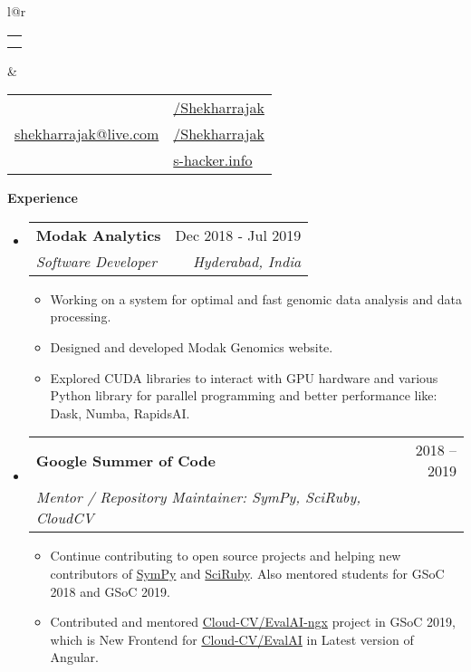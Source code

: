 \documentclass[letterpaper,12pt]{article}[leftmargin=*]
\makeatletter
\def \fullname {Shekhar Prasad Rajak}
\def \subtitle {}
\def \linkedinicon {\faLinkedin}
\def \linkedinlink {https://www.linkedin.com/in/shekhar-prasad-rajak-9988b626/}
\def \linkedintext {/Shekharrajak}
\def \phoneicon {\faPhone}
\def \phonetext {+91-8142478937}
\def \emailicon {\faEnvelope}
\def \emaillink {mailto:shekharrajak@live.com}
\def \emailtext {shekharrajak@live.com}
\def \githubicon {\faGithub}
\def \githublink {https://github.com/Shekharrajak}
\def \githubtext {/Shekharrajak}
\def \websiteicon {\faGlobe}
\def \websitelink {http://s-hacker.info/}
\def \websitetext {s-hacker.info}
\def \headertype {\doublecol} %
\def \entryspacing {-0pt}
\def \linkedin {\linkedinicon \hspace{3pt}\href{\linkedinlink}{\linkedintext}}
\def \phone {\phoneicon \hspace{3pt}{ \phonetext}}
\def \email {\emailicon \hspace{3pt}\href{\emaillink}{\emailtext}}
\def \github {\githubicon \hspace{3pt}\href{\githublink}{\githubtext}}
\def \website {\websiteicon \hspace{3pt}\href{\websitelink}{\websitetext}}
\renewcommand{\section}[2]{\vspace{5pt}
  \colorbox{secondary}{\color{white}\raggedbottom\normalsize\textbf{{#1}{\hspace{7pt}#2}}}
}
\newcommand{\resumeEntryStart}{\begin{itemize}[leftmargin=2.5mm]}
\newcommand{\resumeEntryEnd}{\end{itemize}\vspace{\entryspacing}}
\newcommand{\resumeItemListStart}{\begin{itemize}[leftmargin=4.5mm]}
\newcommand{\resumeItemListEnd}{\end{itemize}}
\newcommand{\resumeItem}[1]{
  \item\small{
    {#1 \vspace{-2pt}}
  }
}
\newcommand{\resumeEntryTSDL}[4]{
  \vspace{-1pt}\item[]
    \begin{tabular*}{0.97\textwidth}{l@{\extracolsep{\fill}}r}
      \textbf{\color{primary}#1} & {\firabook\color{accent}\small#2} \\
      \textit{\color{accent}\small#3} & \textit{\color{accent}\small#4} \\
    \end{tabular*}\vspace{-6pt}
}
\newcommand{\doublecol}[6]{
  \begin{tabular*}{\textwidth}{l@{\extracolsep{\fill}}r}
    {
      \begin{tabular}[c]{l}
        \fontsize{25}{25}\selectfont{\color{primary}{{\textbf{\fullname}}}} \\
        {\textit{\subtitle}} %
      \end{tabular}
    } & {
      \begin{tabular}[c]{l@{\hspace{1.5em}}l}
        {\small#4} & {\small#1} \\
        {\small#5} & {\small#2} \\
        {\small#6} & {\small#3}
      \end{tabular}
    }
  \end{tabular*}
}
\newcommand{\singlecol}[6]{
  \begin{tabular*}{\textwidth}{l@{\extracolsep{\fill}}r}
    {
      \begin{tabular}[b]{l}
        \fontsize{35}{45}\selectfont{\color{primary}{{\textbf{\fullname}}}} \\
        {\textit{\subtitle}} %
      \end{tabular}
    } & {
      \begin{tabular}[c]{l}
        {\small#1} \\
        {\small#2} \\
        {\small#3} \\
        {\small#4} \\
        {\small#5} \\
        {\small#6}
      \end{tabular}
    }
  \end{tabular*}
}
\makeatother
\begin{document}


\headertype{\linkedin}{\github}{\website}{\phone}{\email}{} %
\vspace{-10pt} %



\section{\faPieChart}{Experience}

  \resumeEntryStart
    \resumeEntryTSDL
      {Modak Analytics}{Dec 2018 - Jul 2019}
      {Software Developer}{Hyderabad, India}
    \resumeItemListStart
      \resumeItem {Working on a system for optimal and fast genomic data analysis and
data processing.}
      \resumeItem {Designed and developed Modak Genomics website.}
      \resumeItem {Explored CUDA libraries to interact with GPU hardware and various Python library for parallel programming and better performance like: Dask, Numba, RapidsAI.}
    \resumeItemListEnd
  \resumeEntryEnd

   \resumeEntryStart
    \resumeEntryTSDL
      {Google Summer of Code}{2018 -- 2019}
      {Mentor / Repository Maintainer: SymPy, SciRuby, CloudCV}{}
    \resumeItemListStart
      \resumeItem {Continue contributing to open source projects and helping new contributors of \href{https://github.com/sympy}{SymPy} and \href{https://github.com/sciruby}{SciRuby}. Also mentored students for GSoC 2018 and GSoC 2019.}
      \resumeItem {Contributed and mentored \href{https://github.com/Cloud-CV/EvalAI-ngx}{Cloud-CV/EvalAI-ngx} project in GSoC 2019, which is New Frontend for \href{https://github.com/Cloud-CV/EvalAI}{Cloud-CV/EvalAI} in Latest version of Angular.}
    \resumeItemListEnd
  \resumeEntryEnd
\end{document}
